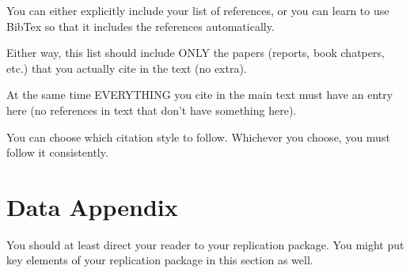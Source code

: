 \documentclass[12pt]{article}
\begin{document}
You can either explicitly include your list of references, or you can learn to use BibTex so that it includes the references automatically.

Either way, this list should include ONLY the papers (reports, book chatpers, etc.) that you actually cite in the text (no extra).

At the same time EVERYTHING you cite in the main text must have an entry here (no references in text that don't have something here).

You can choose which citation style to follow. Whichever you choose, you must follow it consistently.

\newpage
\section*{Data Appendix} \label{sec:appendixa}

You should at least direct your reader to your replication package. You might put key elements of your replication package in this section as well.
\end{document}
